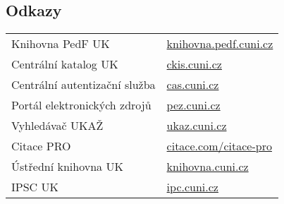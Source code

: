 \subsection{Odkazy}

\begin{tabular}{@{}ll@{}}
  Knihovna PedF UK& \url{knihovna.pedf.cuni.cz} \\

  Centrální katalog UK& \url{ckis.cuni.cz} \\

  Centrální autentizační služba& \url{cas.cuni.cz} \\

  Portál elektronických zdrojů& \url{pez.cuni.cz} \\

  Vyhledávač UKAŽ & \url{ukaz.cuni.cz} \\

  Citace PRO & \url{citace.com/citace-pro} \\

  Ústřední knihovna UK & \url{knihovna.cuni.cz} \\

  IPSC UK & \url{ipc.cuni.cz} 
\end{tabular}
